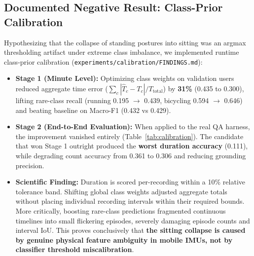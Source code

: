 \documentclass[11pt,a4paper]{article}
\begin{document}
\subsection{Documented Negative Result: Class-Prior Calibration}
\begin{table}[t]
\centering
\small
\caption{\textbf{Documented Negative Result: Class-Prior Calibration.} Testing probability re-weighting to resolve sitting collapse. Stage 1 minute-level proxy gains completely failed to translate into Stage 2 end-to-end QA improvements.}
\label{tab:calibration}
\end{table}

Hypothesizing that the collapse of standing postures into sitting was an argmax thresholding artifact under extreme class imbalance, we implemented runtime class-prior calibration (\nolinkurl{experiments/calibration/FINDINGS.md}):
\begin{itemize}[leftmargin=1.5em,noitemsep,topsep=2pt]
  \item \textbf{Stage 1 (Minute Level):} Optimizing class weights on validation users reduced aggregate time error ($\sum_c |\hat{T}_c - T_c| / T_{\text{total}}$) by \textbf{31\%} (0.435 to 0.300), lifting rare-class recall (running 0.195 $\to$ 0.439, bicycling 0.594 $\to$ 0.646) and beating baseline on Macro-F1 (0.432 vs 0.429).
  \item \textbf{Stage 2 (End-to-End Evaluation):} When applied to the real QA harness, the improvement vanished entirely (Table~\ref{tab:calibration}). The candidate that won Stage 1 outright produced the \textbf{worst duration accuracy} (0.111), while degrading count accuracy from 0.361 to 0.306 and reducing grounding precision.
  \item \textbf{Scientific Finding:} Duration is scored per-recording within a 10\% relative tolerance band. Shifting global class weights adjusted aggregate totals without placing individual recording intervals within their required bounds. More critically, boosting rare-class predictions fragmented continuous timelines into small flickering episodes, severely damaging episode counts and interval IoU. This proves conclusively that \textbf{the sitting collapse is caused by genuine physical feature ambiguity in mobile IMUs, not by classifier threshold miscalibration}.
\end{itemize}
\end{document}
